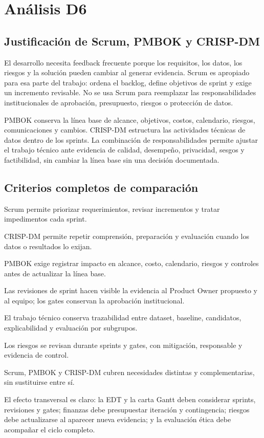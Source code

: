 \section{Análisis D6}

\subsection{Justificación de Scrum, PMBOK y CRISP-DM}

El desarrollo necesita feedback frecuente porque los requisitos, los datos, los riesgos y la solución pueden cambiar al generar evidencia. Scrum es apropiado para esa parte del trabajo: ordena el backlog, define objetivos de sprint y exige un incremento revisable. No se usa Scrum para reemplazar las responsabilidades institucionales de aprobación, presupuesto, riesgos o protección de datos.

PMBOK conserva la línea base de alcance, objetivos, costos, calendario, riesgos, comunicaciones y cambios. CRISP-DM estructura las actividades técnicas de datos dentro de los sprints. La combinación de responsabilidades permite ajustar el trabajo técnico ante evidencia de calidad, desempeño, privacidad, sesgos y factibilidad, sin cambiar la línea base sin una decisión documentada.

\subsection{Criterios completos de comparación}

\begin{description}[style=nextline]
  \item[Desarrollo] Scrum permite priorizar requerimientos, revisar incrementos y tratar impedimentos cada sprint.
  \item[Incertidumbre] CRISP-DM permite repetir comprensión, preparación y evaluación cuando los datos o resultados lo exijan.
  \item[Cambios] PMBOK exige registrar impacto en alcance, costo, calendario, riesgos y controles antes de actualizar la línea base.
  \item[Retroalimentación] Las revisiones de sprint hacen visible la evidencia al Product Owner propuesto y al equipo; los gates conservan la aprobación institucional.
  \item[Datos y modelos] El trabajo técnico conserva trazabilidad entre dataset, baseline, candidatos, explicabilidad y evaluación por subgrupos.
  \item[Riesgos] Los riesgos se revisan durante sprints y gates, con mitigación, responsable y evidencia de control.
  \item[Adecuación] Scrum, PMBOK y CRISP-DM cubren necesidades distintas y complementarias, sin sustituirse entre sí.
\end{description}

El efecto transversal es claro: la EDT y la carta Gantt deben considerar sprints, revisiones y gates; finanzas debe presupuestar iteración y contingencia; riesgos debe actualizarse al aparecer nueva evidencia; y la evaluación ética debe acompañar el ciclo completo.
